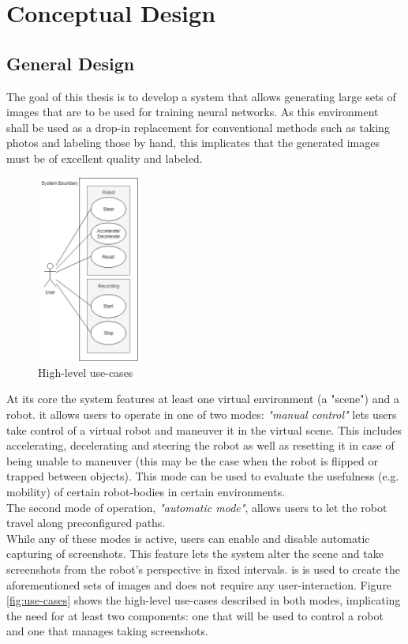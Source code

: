 \chapter{Conceptual Design}

\section{General Design}
The goal of this thesis is to develop a system that allows generating large sets of images that are to be used for training neural networks. As this environment shall be used as a drop-in replacement for conventional methods such as taking photos and labeling those by hand, this implicates that the generated images must be of excellent quality and labeled.\\

\begin{figure}
\centering
\includegraphics[width=0.3\textwidth]{tex/img/ch04/Use_Cases_04.png}
\caption{\label{fig:frog1}High-level use-cases}
\end{figure}

At its core the system features at least one virtual environment (a "scene") and a robot. it allows users to operate in one of two modes: \textit{"manual control"} lets users take control of a virtual robot and maneuver it in the virtual scene. This includes accelerating, decelerating and steering the robot as well as resetting it in case of being unable to maneuver (this may be the case when the robot is flipped or trapped between objects). This mode can be used to evaluate the usefulness (e.g. mobility) of certain robot-bodies in certain environments.\\
The second mode of operation, \textit{"automatic mode"}, allows users to let the robot travel along preconfigured paths.\\
While any of these modes is active, users can enable and disable automatic capturing of screenshots. This feature lets the system alter the scene and take screenshots from the robot's perspective in fixed intervals. is is used to create the aforementioned sets of images and does not require any user-interaction.
Figure \ref{fig:use-cases} shows the high-level use-cases described in both modes, implicating the need for at least two components: one that will be used to control a robot and one that manages taking screenshots. 

